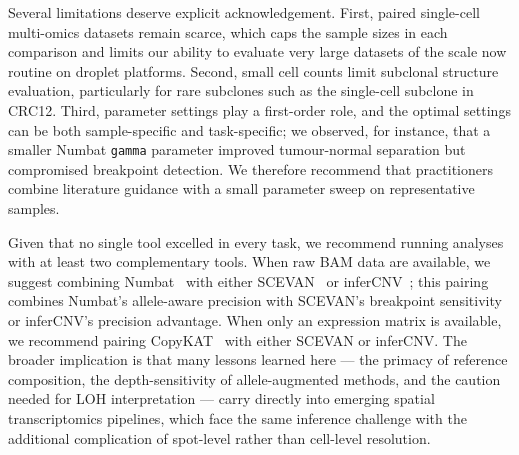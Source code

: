 \documentclass[11pt]{article}
\begin{document}
Several limitations deserve explicit acknowledgement. First, paired
single-cell multi-omics datasets remain scarce, which caps the sample sizes
in each comparison and limits our ability to evaluate very large datasets
of the scale now routine on droplet platforms. Second, small cell counts
limit subclonal structure evaluation, particularly for rare subclones such
as the single-cell subclone in CRC12. Third, parameter settings play a
first-order role, and the optimal settings can be both sample-specific and
task-specific; we observed, for instance, that a smaller Numbat
\texttt{gamma} parameter improved tumour-normal separation but compromised
breakpoint detection. We therefore recommend that practitioners combine
literature guidance with a small parameter sweep on representative samples.

Given that no single tool excelled in every task, we recommend running
analyses with at least two complementary tools. When raw BAM data are
available, we suggest combining Numbat~\cite{gao2023numbat} with either
SCEVAN~\cite{defalco2023scevan} or inferCNV~\cite{tickle2019infercnv};
this pairing combines Numbat's allele-aware precision with SCEVAN's
breakpoint sensitivity or inferCNV's precision advantage. When only an
expression matrix is available, we recommend pairing
CopyKAT~\cite{gao2021copykat} with either SCEVAN or inferCNV. The broader
implication is that many lessons learned here --- the primacy of reference
composition, the depth-sensitivity of allele-augmented methods, and the
caution needed for LOH interpretation --- carry directly into emerging
spatial transcriptomics pipelines, which face the same inference challenge
with the additional complication of spot-level rather than cell-level
resolution.


\end{document}
